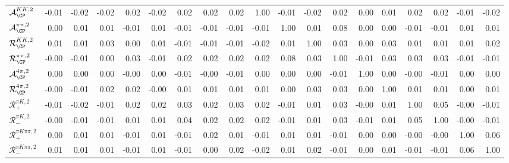 \begin{sidewaystable}
\begin{tabular}{l|rrrrrrrrrrrrrrrrrr}
$\mathcal{A}_{\CP}^{KK,2}$& -0.01& -0.02& -0.02& 0.02& -0.02& 0.02& 0.02& 0.02& 1.00& -0.01& -0.02& 0.02& 0.00& 0.01& 0.02& 0.02& -0.01& -0.02 \\

$\mathcal{A}_{\CP}^{\pi\pi,2}$& 0.00& 0.01& 0.01& -0.01& 0.01& -0.01& -0.01& -0.01& -0.01& 1.00& 0.01& 0.08& 0.00& 0.00& -0.01& -0.01& 0.01& 0.01 \\

$\mathcal{R}_{\CP}^{KK,2}$& 0.01& 0.01& 0.03& 0.00& 0.01& -0.01& -0.01& -0.01& -0.02& 0.01& 1.00& 0.03& 0.00& 0.03& 0.01& 0.01& 0.01& 0.02 \\

$\mathcal{R}_{\CP}^{\pi\pi,2}$& -0.00& -0.01& 0.00& 0.03& -0.01& 0.02& 0.02& 0.02& 0.02& 0.08& 0.03& 1.00& -0.01& 0.03& 0.03& 0.03& -0.01& -0.01 \\

$\mathcal{A}_{\CP}^{4\pi,2}$& 0.00& 0.00& 0.00& -0.00& 0.00& -0.01& -0.00& -0.01& 0.00& 0.00& 0.00& -0.01& 1.00& 0.00& -0.00& -0.01& 0.00& 0.00 \\

$\mathcal{R}_{\CP}^{4\pi,2}$& -0.00& -0.01& 0.02& 0.02& -0.00& 0.01& 0.01& 0.01& 0.01& 0.00& 0.03& 0.03& 0.00& 1.00& 0.01& 0.01& 0.00& 0.01 \\

$\mathcal{R}_+^{\pi K,2}$& -0.01& -0.02& -0.01& 0.02& 0.02& 0.03& 0.02& 0.03& 0.02& -0.01& 0.01& 0.03& -0.00& 0.01& 1.00& 0.05& -0.00& -0.01 \\

$\mathcal{R}_-^{\pi K,2}$& -0.00& -0.01& -0.01& 0.01& 0.01& 0.04& 0.02& 0.02& 0.02& -0.01& 0.01& 0.03& -0.01& 0.01& 0.05& 1.00& -0.00& -0.01 \\

$\mathcal{R}_+^{\pi K\pi\pi,2}$& 0.00& 0.01& 0.01& -0.01& 0.01& -0.01& 0.02& 0.01& -0.01& 0.01& 0.01& -0.01& 0.00& 0.00& -0.00& -0.00& 1.00& 0.06 \\

$\mathcal{R}_-^{\pi K\pi\pi,2}$& 0.01& 0.01& 0.01& -0.01& 0.01& -0.01& 0.00& 0.02& -0.02& 0.01& 0.02& -0.01& 0.00& 0.01& -0.01& -0.01& 0.06& 1.00 \\
\end{tabular}
\end{sidewaystable}
\label{tab:correlation_splitObs}
